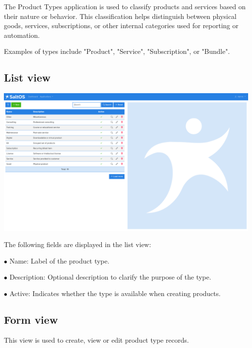\documentclass[a4paper]{article}
\begin{document}
The Product Types application is used to classify products and services based on their nature or behavior.
This classification helps distinguish between physical goods, services, subscriptions, or other internal categories used for reporting or automation.

Examples of types include "Product", "Service", "Subscription", or "Bundle".

\hypertarget{toc163}{}
\subsection{List view}

\begin{center}\includegraphics[width=1\textwidth]{../ujest/snaps/test-screenshots-js-screenshots-sales-products-types-list-en-us-1-snap.png}\end{center}

The following fields are displayed in the list view:

\begin{compactitem}
\item[\color{myblue}$\bullet$] Name: Label of the product type.
\item[\color{myblue}$\bullet$] Description: Optional description to clarify the purpose of the type.
\item[\color{myblue}$\bullet$] Active: Indicates whether the type is available when creating products.
\end{compactitem}

\hypertarget{toc164}{}
\subsection{Form view}

This view is used to create, view or edit product type records.
\end{document}
